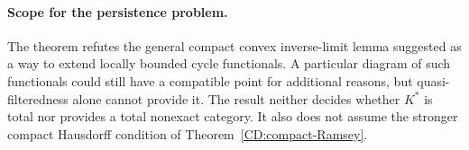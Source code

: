 \paragraph{Scope for the persistence problem.}
The theorem refutes the general compact convex inverse-limit lemma
suggested as a way to extend locally bounded cycle functionals.
A particular diagram of such functionals could still have a compatible
point for additional reasons, but quasi-filteredness alone cannot
provide it. The result neither decides whether $K^*$ is total nor
provides a total nonexact category. It also does not assume the
stronger compact Hausdorff condition of
Theorem~\ref{CD:compact-Ramsey}.
